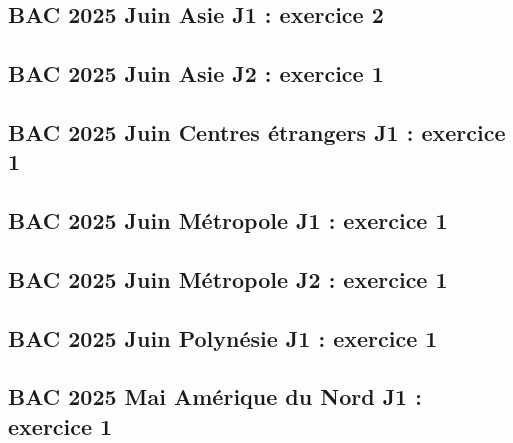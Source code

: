 \documentclass[lang=fr,edition=teacher,layout=sheet]{mxbook}
\begin{document}
\begingroup\endgroup
\par\bigskip
{}\subsection*{BAC 2025 Juin Asie J1 : exercice 2}
\begingroup\endgroup
\par\bigskip
{}\subsection*{BAC 2025 Juin Asie J2 : exercice 1}
\begingroup\endgroup
\par\bigskip
{}\subsection*{BAC 2025 Juin Centres étrangers J1 : exercice 1}
\begingroup\endgroup
\par\bigskip
{}\subsection*{BAC 2025 Juin Métropole J1 : exercice 1}
\begingroup\endgroup
\par\bigskip
{}\subsection*{BAC 2025 Juin Métropole J2 : exercice 1}
\begingroup\endgroup
\par\bigskip
{}\subsection*{BAC 2025 Juin Polynésie J1 : exercice 1}
\begingroup\endgroup
\par\bigskip
{}\subsection*{BAC 2025 Mai Amérique du Nord J1 : exercice 1}
\end{document}
